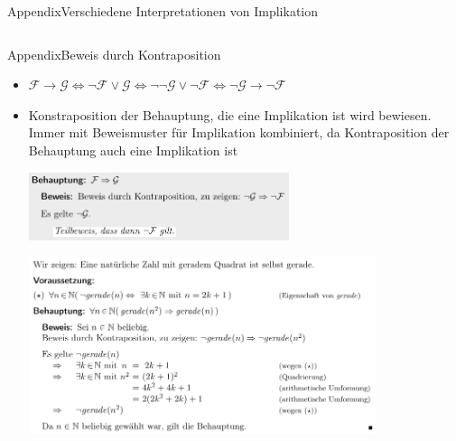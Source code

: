 \begin{frame}[allowframebreaks]{Appendix}{Verschiedene Interpretationen von Implikation}
\begin{enumerate}
\begin{columns}
\begin{column}{0.5\textwidth}
{\begin{minipage}[t]{8cm}
          \end{minipage}
        }
      \end{column}
      \begin{column}{0.5\textwidth}
      \end{column}
    \end{columns}
  \end{enumerate}
\end{frame}

\begin{frame}[allowframebreaks]{Appendix}{Beweis durch Kontraposition}
  \begin{itemize}
    \item $\mathcal{F}\rightarrow\mathcal{G}\Leftrightarrow\neg\mathcal{F}\vee\mathcal{G}\Leftrightarrow\neg\neg\mathcal{G}\vee¬\mathcal{F}\Leftrightarrow\neg\mathcal{G}\rightarrow\neg\mathcal{F}$

    \item Konstraposition der Behauptung, die eine Implikation ist wird bewiesen. Immer mit Beweismuster für Implikation kombiniert, da Kontraposition der Behauptung auch eine Implikation ist

  \includegraphics[width=0.6\textwidth, center]{./figures/kontraposition.png}

  \includegraphics[width=0.8\textwidth, center]{./figures/kontraposition_example.png}
  \end{itemize}
\end{frame}

